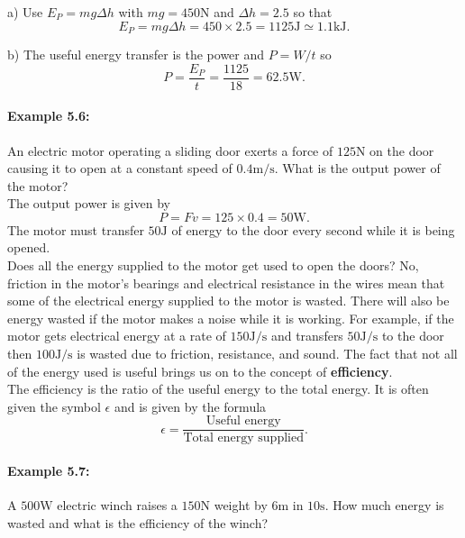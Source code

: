 \documentclass[a4paper,12pt]{book}
\begin{document}
a) Use $E_{P}=mg\Delta h$ with $mg =450\text{N}$ and $\Delta h= 2.5$ so that
\begin{equation*}
E_{P}=mg\Delta h=450\times 2.5 =1125\text{J}\simeq 1.1\text{kJ}.
\end{equation*}

b) The useful energy transfer is the power and $P=W/t$ so 
\begin{equation*}
P=\frac{E_{P}}{t}=\frac{1125}{18}=62.5\text{W}.
\end{equation*}

\paragraph{Example 5.6:} An electric motor operating a sliding door exerts a force of $125\text{N}$ on the door causing it to open at a constant speed of $0.4 \text{m/s}$. What is the output power of the motor?\\

The output power is given by
\begin{equation*}
P=Fv=125\times 0.4 =50\text{W}.
\end{equation*}
The motor must transfer $50\text{J}$ of energy to the door every second while it is being opened.\\

Does all the energy supplied to the motor get used to open the doors? No, friction in the motor's bearings and electrical resistance in the wires mean that some of the electrical energy supplied to the motor is wasted. There will also be energy wasted if the motor makes a noise while it is working. For example, if the motor gets electrical energy at a rate of $150\text{J/s}$ and transfers $50\text{J/s}$ to the door then $100\text{J/s}$ is wasted due to friction, resistance, and sound. The fact that not all of the energy used is useful brings us on to the concept of \textbf{efficiency}.\\

The efficiency is the ratio of the useful energy to the total energy. It is often given the symbol $\epsilon$ and is given by the formula
\begin{equation*}
\epsilon =\frac{\text{Useful energy}}{\text{Total energy supplied}}.
\end{equation*}

\paragraph{Example 5.7:}  A $500\text{W}$ electric winch raises a $150\text{N}$ weight by $6\text{m}$ in $10\text{s}$. How much energy is wasted and what is the efficiency of the winch?\\
\end{document}
